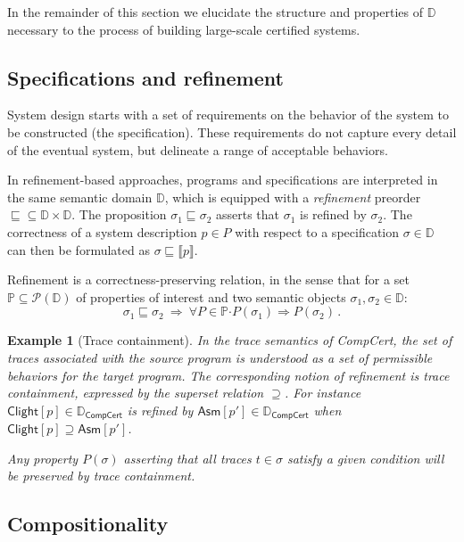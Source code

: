 \documentclass[draft,11pt]{report}
\newtheorem{example}[theorem]{Example}
\theoremstyle{definition}
\newcommand{\kw}[1]{\ensuremath{ \mathsf{#1} }}
\newcommand{\bdot}{\boldsymbol{\cdot}}
\newcommand{\refby}{\sqsubseteq} %
\begin{document}
In the remainder of this section we elucidate
the structure and properties of $\mathbb{D}$
necessary to the process of building
large-scale certified systems.


\subsection{Specifications and refinement} %

System design starts with a set of requirements
on the behavior of the system to be constructed
(the specification).
These requirements do not capture every detail
of the eventual system,
but delineate a range of acceptable behaviors.

In refinement-based approaches,
programs and specifications are interpreted in the same
semantic domain $\mathbb{D}$,
which is equipped with a \emph{refinement} preorder
${\refby} \subseteq \mathbb{D} \times \mathbb{D}$.
The proposition $\sigma_1 \refby \sigma_2$
asserts that $\sigma_1$ is refined by $\sigma_2$.
The correctness of a system description $p \in P$
with respect to a specification $\sigma \in \mathbb{D}$
can then be formulated as
$\sigma \refby \llbracket p \rrbracket$.

Refinement is a correctness-preserving relation,
in the sense that for a set
$\mathbb{P} \subseteq \mathcal{P}(\mathbb{D})$
of properties of interest
and two semantic objects $\sigma_1, \sigma_2 \in \mathbb{D}$:
\[
  \sigma_1 \refby \sigma_2 \:\Rightarrow\:
  \forall P \in \mathbb{P} \bdot
    P(\sigma_1) \Rightarrow P(\sigma_2) \,.
\]

\begin{example}[Trace containment]
In the trace semantics of CompCert,
the set of traces associated with the source program
is understood as a set of \emph{permissible} behaviors
for the target program.
The corresponding notion of refinement is
\emph{trace containment},
expressed by the superset relation $\supseteq$.
For instance
$\kw{Clight}[p] \in \mathbb{D}_\kw{CompCert}$
is refined by
$\kw{Asm}[p'] \in \mathbb{D}_\kw{CompCert}$
when
$
  \kw{Clight}[p] \supseteq \kw{Asm}[p']
$.

Any property $P(\sigma)$
asserting that \emph{all} traces
$t \in \sigma$
satisfy a given condition
will be preserved by trace containment.
\end{example}


\subsection{Compositionality} %
\end{document}
